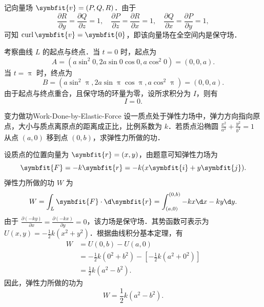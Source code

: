 \begin{solution}
    记向量场 $\symbfit{v} = (P, Q, R)$．由于
    \begin{equation}
        \frac{\partial R}{\partial y} = \frac{\partial Q}{\partial z} = 1, \quad \frac{\partial P}{\partial z} = \frac{\partial R}{\partial x} = 1, \quad \frac{\partial Q}{\partial x} = \frac{\partial P}{\partial y} = 1,
    \end{equation}
    可知 $\operatorname{curl} \symbfit{v} = \symbfit{0}$，即该向量场在全空间内是保守场．

    考察曲线 $L$ 的起点与终点．当 $t = 0$ 时，起点为
    \begin{equation}
        A = (a \sin^2 0, 2a \sin 0 \cos 0, a \cos^2 0) = (0, 0, a).
    \end{equation}
    当 $t = \uppi$ 时，终点为
    \begin{equation}
        B = (a \sin^2 \uppi, 2a \sin \uppi \cos \uppi, a \cos^2 \uppi) = (0, 0, a).
    \end{equation}
    由于起点与终点重合，且保守场的环量为零，设所求积分为 $I$，则有
    \begin{equation}
        \boxed{I = 0}.
    \end{equation}
\end{solution}

\begin{problem}{变力做功}{Work-Done-by-Elastic-Force}
    设一质点处于弹性力场中，弹力方向指向原点，大小与质点离原点的距离成正比，比例系数为 $k$．若质点沿椭圆 $\frac{x^2}{a^2} + \frac{y^2}{b^2} = 1$ 从点 $(a, 0)$ 移到点 $(0, b)$，求弹性力所做的功．
\end{problem}

\begin{solution}
    设质点的位置向量为 $\symbfit{r} = (x, y)$，由题意可知弹性力场为
    \begin{equation}
        \symbfit{F} = -k \symbfit{r} = -k(x \symbfit{i} + y \symbfit{j}).
    \end{equation}
    弹性力所做的功 $W$ 为
    \begin{equation}
        W = \int_L \symbfit{F} \cdot \d \symbfit{r} = \int_{(a, 0)}^{(0, b)} -kx \d x - ky \d y.
    \end{equation}
    由于 $\frac{\partial (-ky)}{\partial x} = \frac{\partial (-kx)}{\partial y} = 0$，该力场是保守场．其势函数可表示为 $U(x, y) = -\frac{1}{2}k(x^2 + y^2)$．根据曲线积分基本定理，有
    \begin{equation}
        \begin{aligned}
            W & = U(0, b) - U(a, 0)                                                  \\
              & = -\frac{1}{2}k(0^2 + b^2) - \left[ -\frac{1}{2}k(a^2 + 0^2) \right] \\
              & = \frac{1}{2}k(a^2 - b^2).
        \end{aligned}
    \end{equation}
    因此，弹性力所做的功为
    \begin{equation}
        \boxed{W = \frac{1}{2}k(a^2 - b^2)}.
    \end{equation}
\end{solution}

